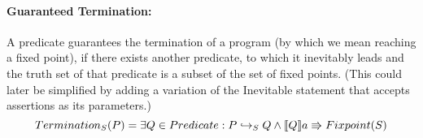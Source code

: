 \paragraph{Guaranteed Termination:}
A predicate guarantees the termination of a program (by which we mean reaching a fixed point), if there exists another predicate, to which it inevitably leads and the truth set of that predicate is a subset of the set of fixed points.
(This could later be simplified by adding a variation of the Inevitable statement that accepts assertions as its parameters.)
\begin{equation}
    Termination_S(P) = \exists Q \in Predicate : P \hookrightarrow_S Q \land \llbracket Q \rrbracket a \Rrightarrow Fixpoint(S)
\end{equation}
\begin{code}
    \>[2]\AgdaSpace{}%
    \AgdaSymbol{:}\AgdaSpace{}%
    \AgdaSpace{}%
    \AgdaSpace{}%
    \AgdaSpace{}%
    \AgdaSpace{}%
    \<%
    \\
    \>[2]\AgdaSpace{}%
    \AgdaSpace{}%
    \AgdaSpace{}%
    \AgdaSymbol{=}\AgdaSpace{}%
    \AgdaSpace{}%
    \AgdaSpace{}%
    \AgdaSpace{}%
    \AgdaSpace{}%
    \AgdaSpace{}%
    \AgdaSymbol{(}\AgdaSpace{}%
    \AgdaOperator{\AgdaFunction{↪[}}\AgdaSpace{}%
    \AgdaSpace{}%
    \AgdaOperator{\AgdaFunction{]}}\AgdaSpace{}%
    \AgdaSpace{}%
    \AgdaSpace{}%
    \AgdaSpace{}%
    \AgdaSpace{}%
    \AgdaSpace{}%
    \AgdaSpace{}%
    \AgdaSpace{}%
    \AgdaSymbol{))}\<%
    \\
    \\[\AgdaEmptyExtraSkip]%
    \>[2]\AgdaSpace{}%
    \AgdaSpace{}%
    \<%
    \\
    \>[2]\AgdaSpace{}%
    \AgdaSymbol{:}\AgdaSpace{}%
    \AgdaSpace{}%
    \AgdaSpace{}%
    \AgdaSpace{}%
    \AgdaSpace{}%
    \<%
    \\
    \>[2]\AgdaSpace{}%
    \AgdaOperator{\AgdaFunction{∈TERM[}}\AgdaSpace{}%
    \AgdaSpace{}%
    \AgdaOperator{\AgdaFunction{]}}\AgdaSpace{}%
    \AgdaSymbol{=}\AgdaSpace{}%
    \AgdaSpace{}%
    \AgdaSpace{}%
    \<%
\end{code}

